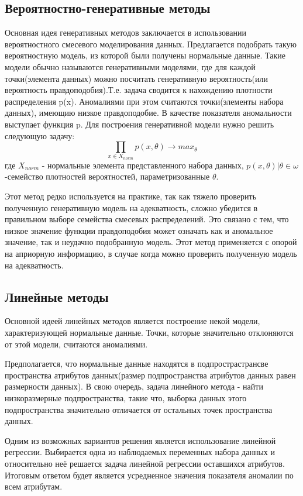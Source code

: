 \subsection{Вероятностно-генеративные методы}
Основная идея генеративных методов заключается в использовании вероятностного смесевого моделирования данных. Предлагается подобрать такую вероятностную модель, из которой были получены нормальные данные. Такие модели обычно называются генеративными моделями, где для каждой точки(элемента данных) можно посчитать генеративную вероятность(или вероятность правдоподобия).Т.е. задача  сводится к нахождению плотности распределения p(x). Аномалиями при этом  считаются точки(элементы набора данных), имеющию низкое правдоподобие. В качестве показателя аномальности выступает функция p.
Для построения генеративной модели нужно решить следующую задачу:
\begingroup
\Large
\begin{equation}
\prod \limits_{x \in X_{norm}} p(x,\theta)  \rightarrow max_\theta
\end{equation}
\endgroup
где \begingroup \Large$ X_{norm}$ \endgroup - нормальные элемента представленного набора данных, ${p(x,\theta)|\theta \in \omega}$ -семейство плотностей вероятностей, параметризованные $\theta$.

Этот метод редко используется на практике, так как тяжело проверить полученную генеративную модель на адекватность, сложно  убедится в правильном выборе семейства смесевых распределений. Это связано с тем, что низкое значение функции правдоподобия может означать как и аномальное значение, так и неудачно подобранную модель. Этот метод применяется с опорой на априорную информацию, в случае когда можно проверить полученную модель на адекватность.
\subsection{Линейные методы}
Основной идеей линейных методов является построение некой  модели, характеризующей нормальные данные. Точки, которые значительно отклоняются от этой модели, считаются аномалиями.

Предполагается, что нормальные данные  находятся в подпрострастрансве пространства атрибутов данных(размер подпространства атрибутов данных равен размерности данных). В свою очередь, задача линейного метода - найти низкоразмерные подпространства, такие что, выборка данных этого подпространства значительно отличается от остальных точек пространства данных.

Одним из возможных вариантов решения является использование линейной регрессии. Выбирается одна из наблюдаемых переменных  набора данных и относительно неё решается задача линейной регрессии оставшихся атрибутов. Итоговым ответом будет является усредненное значения показателя аномалии по всем атрибутам. 

